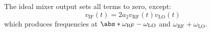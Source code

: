 \documentclass{article}
\begin{document}
The ideal mixer output sets all terms to zero, except:
\begin{equation*}
    v_{\mathrm{IF}}\left( t \right) = 2 a_2 v_{\mathrm{RF}}\left( t \right) v_{\mathrm{LO}}\left( t \right)
\end{equation*}
which produces frequencies at \(\abs*{\omega_{\mathrm{RF}} - \omega_{\mathrm{LO}}}\) and \(\omega_{\mathrm{RF}} + \omega_{\mathrm{LO}}\).
\end{document}
